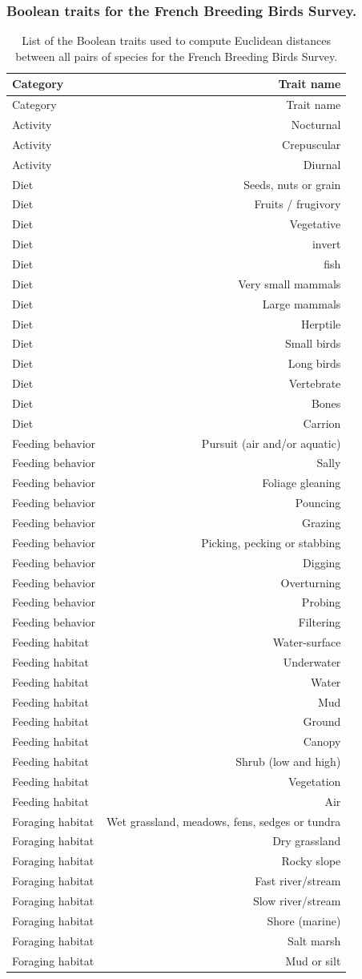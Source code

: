 \begin{landscape}

\subsubsection{Boolean traits for the French Breeding Birds Survey.}

\begin{longtable}[]{@{}lr@{}}
\caption[List of the Boolean traits for the French Breeding Birds Survey dataset.]{List of the Boolean traits used to compute Euclidean distances
between all pairs of species for the French Breeding Birds Survey.
\label{tbl:trtfbbs}}\tabularnewline
\toprule
Category & Trait name\tabularnewline
\midrule
\endfirsthead
\toprule
Category & Trait name\tabularnewline
\midrule
\endhead
Activity & Nocturnal\tabularnewline
Activity & Crepuscular\tabularnewline
Activity & Diurnal\tabularnewline
Diet & Seeds, nuts or grain\tabularnewline
Diet & Fruits / frugivory\tabularnewline
Diet & Vegetative\tabularnewline
Diet & invert\tabularnewline
Diet & fish\tabularnewline
Diet & Very small mammals\tabularnewline
Diet & Large mammals\tabularnewline
Diet & Herptile\tabularnewline
Diet & Small birds\tabularnewline
Diet & Long birds\tabularnewline
Diet & Vertebrate\tabularnewline
Diet & Bones\tabularnewline
Diet & Carrion\tabularnewline
Feeding behavior & Pursuit (air and/or aquatic)\tabularnewline
Feeding behavior & Sally\tabularnewline
Feeding behavior & Foliage gleaning\tabularnewline
Feeding behavior & Pouncing\tabularnewline
Feeding behavior & Grazing\tabularnewline
Feeding behavior & Picking, pecking or stabbing\tabularnewline
Feeding behavior & Digging\tabularnewline
Feeding behavior & Overturning\tabularnewline
Feeding behavior & Probing\tabularnewline
Feeding behavior & Filtering\tabularnewline
Feeding habitat & Water-surface\tabularnewline
Feeding habitat & Underwater\tabularnewline
Feeding habitat & Water\tabularnewline
Feeding habitat & Mud\tabularnewline
Feeding habitat & Ground\tabularnewline
Feeding habitat & Canopy\tabularnewline
Feeding habitat & Shrub (low and high)\tabularnewline
Feeding habitat & Vegetation\tabularnewline
Feeding habitat & Air\tabularnewline
Foraging habitat & Wet grassland, meadows, fens, sedges or
tundra\tabularnewline
Foraging habitat & Dry grassland\tabularnewline
Foraging habitat & Rocky slope\tabularnewline
Foraging habitat & Fast river/stream\tabularnewline
Foraging habitat & Slow river/stream\tabularnewline
Foraging habitat & Shore (marine)\tabularnewline
Foraging habitat & Salt marsh\tabularnewline
Foraging habitat & Mud or silt\tabularnewline

\end{longtable}
\end{landscape}

